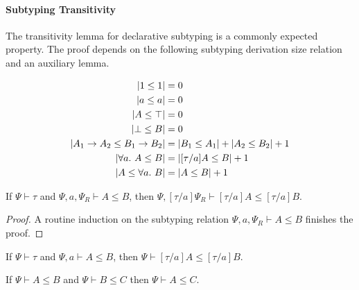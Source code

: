 \paragraph{Subtyping Transitivity}

The transitivity lemma for declarative subtyping is a commonly expected property.
The proof depends on the following subtyping derivation size relation and an auxiliary lemma.

\begin{definition}
    \begin{gather*}
        \begin{aligned}
            |1 \le 1| &= 0\\
            |a \le a| &= 0\\
            |A \le \top| &= 0\\
            |\bot \le B| &= 0\\
            |A_1 \to A_2 \le B_1 \to B_2| &= |B_1 \le A_1| + |A_2 \le B_2| + 1\\
            |\all A \le B| &= |[\tau/a]A \le B| + 1\\
            |A \le \all B| &= |A \le B| + 1
        \end{aligned}
    \end{gather*}
\end{definition}

\begin{lemma}
    If $\Psi \vdash \tau$ and $\Psi, a, \Psi_R \vdash A \le B$, then
    $\Psi, [\tau/a]\Psi_R \vdash [\tau/a]A \le [\tau/a]B$.
\end{lemma}

\begin{proof}
    A routine induction on the subtyping relation $\Psi, a, \Psi_R \vdash A \le B$
    finishes the proof.
\end{proof}

\begin{corollary}
    \label{cor:subtyping_subst_mono}
    If $\Psi \vdash \tau$ and $\Psi, a \vdash A \le B$, then
    $\Psi \vdash [\tau/a]A \le [\tau/a]B$.
\end{corollary}

\begin{lemma}
    If $\Psi \vdash A \le B$ and $\Psi \vdash B \le C$ then
    $\Psi \vdash A \le C$.
\end{lemma}

